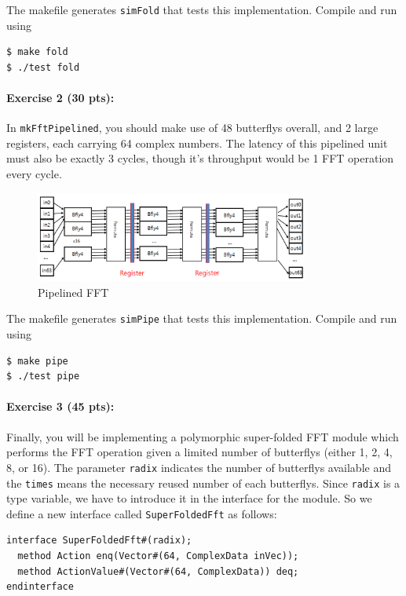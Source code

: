 \documentclass{article}
\begin{document}
The makefile generates \texttt{simFold} that tests this implementation.
Compile and run using
\begin{verbatim}
$ make fold
$ ./test fold
\end{verbatim}

\noindent \paragraph{\bf Exercise 2 (30 pts):} 
In \texttt{mkFftPipelined}, you should make use of 48 butterflys overall, and
2 large registers, each carrying 64 complex numbers. 
The latency of this pipelined unit must also
be exactly 3 cycles, though it's throughput would be 1 FFT operation every
cycle.

\begin{figure}[!h]
\centering
\includegraphics[width=0.8\textwidth]{figs/pipe.png}
\caption{Pipelined FFT}
\label{pipe}
\end{figure}

The makefile generates \texttt{simPipe} that tests this implementation.
Compile and run using
\begin{verbatim}
$ make pipe
$ ./test pipe
\end{verbatim}

\noindent \paragraph{\bf Exercise 3 (45 pts):} 
Finally, you will be implementing a polymorphic super-folded FFT module which
performs the FFT operation given a limited number of butterflys (either 1, 2,
4, 8, or 16). The parameter \texttt{radix} indicates the number of butterflys available
and the \texttt{times} means the necessary reused
number of each butterflys. Since \texttt{radix} 
is a type variable, we have to introduce it in the interface for the module. 
So we define a new interface called \texttt{SuperFoldedFft} as follows:

\begin{verbatim}
interface SuperFoldedFft#(radix);
  method Action enq(Vector#(64, ComplexData inVec));
  method ActionValue#(Vector#(64, ComplexData)) deq;
endinterface
\end{verbatim}
\end{document}
